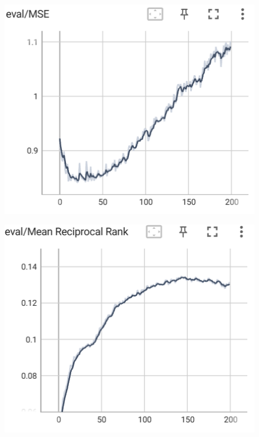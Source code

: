 \documentclass[12pt]{article}
\begin{document}
\begin{enumerate}
    \begin{figure}[htbp]
	\centering
	\begin{minipage}{0.4\linewidth}
		\centering
		\includegraphics[width=0.9\linewidth]{./figs/shared_eval_mse_99_1.png}
		\label{pic one}%
	\end{minipage}
	\begin{minipage}{0.4\linewidth}
		\centering
		\includegraphics[width=0.9\linewidth]{./figs/shared_eval_mrr_99_1.png}
		\label{pic two}%
	\end{minipage}
    \end{figure}

    \newpage


\end{enumerate}
\end{document}
